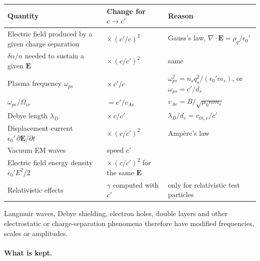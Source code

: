 \documentclass[a4paper, 11pt]{article}
\begin{document}
\begin{center}
\begin{tabular}{p{} p{} p{}}
\hline
Quantity & Change for $c \to c'$ & Reason \\
\hline
Electric field produced by a given charge separation & $\times\,(c'/c)^2$ & Gauss's law, $\nabla\cdot\mathbf{E} = \rho_q/\epsilon_0'$ \\
$\delta n/n$ needed to sustain a given $\mathbf{E}$ & $\times\,(c/c')^2$ & same \\
Plasma frequency $\omega_{ps}$ & $\times\, c'/c$ & $\omega_{ps}^2 = n_s q_s^2/(\epsilon_0' m_s)$, or $\omega_{ps} = c'/d_s$ \\
$\omega_{pe}/\Omega_{ce}$ & $= c'/v_{Ae}$ & $v_{Ae} = B/\sqrt{\mu_0 n m_e}$ \\
Debye length $\lambda_D$ & $\times\, c/c'$ & $\lambda_D/d_e = v_{th,e}/c'$ \\
Displacement current $\epsilon_0'\,\partial\mathbf{E}/\partial t$ & $\times\,(c/c')^2$ & Amp\`ere's law \\
Vacuum EM waves & speed $c'$ & \\
Electric field energy density $\epsilon_0' E^2/2$ & $\times\,(c/c')^2$ for the same $\mathbf{E}$ & \\
Relativistic effects & $\gamma$ computed with $c'$ & only for relativistic test particles \\
\hline
\end{tabular}
\end{center}

Langmuir waves, Debye shielding, electron holes, double layers and other electrostatic or charge-separation phenomena therefore have modified frequencies, scales or amplitudes.

\paragraph{What is kept.}
\end{document}
